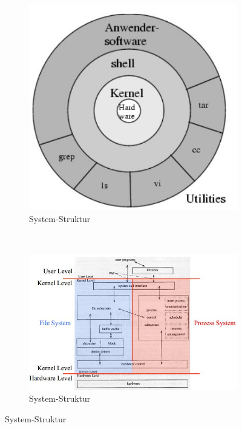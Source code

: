 \begin{figure}[h!]
	\centering
	\begin{subfigure}[b]{0.4\textwidth}
		\includegraphics[width=\textwidth]{fig/system-software-system-struktur}
		\caption{System-Struktur}
		\label{fig:system-software-system-struktur}
	\end{subfigure}
	~
	\begin{subfigure}[b]{0.5\textwidth}
		\includegraphics[width=\textwidth]{fig/system-software-systemkern}
		\caption{System-Struktur}
		\label{fig:system-software-systemkern}
	\end{subfigure}
\end{figure}

